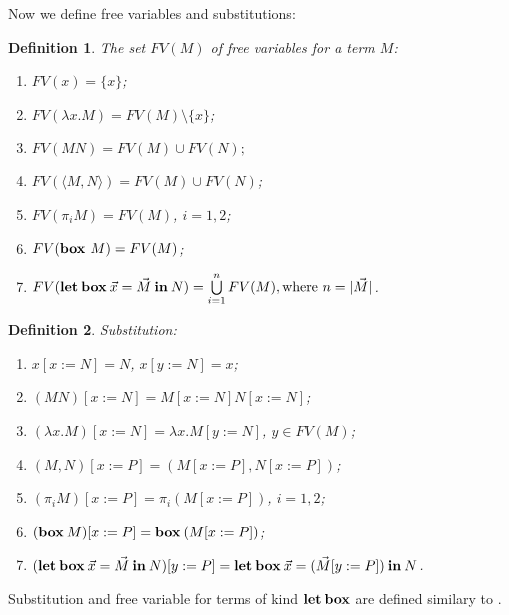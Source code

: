 \documentclass[a4paper]{article}
\newtheorem{defin}{Definition}
\begin{document}
  Now we define free variables and substitutions:

  \begin{defin} The set $FV(M)$ of free variables for a term $M$:

\begin{enumerate}
  \item $FV(x) = \{ x \}$;
  \item $FV(\lambda x. M) = FV(M) \setminus \{ x\}$;
  \item $FV(M N) = FV(M) \cup FV(N);$
  \item $FV(\langle M,N \rangle) = FV(M) \cup FV(N)$;
  \item $FV(\pi_i M) = FV(M)$, $i = 1, 2$;
  \item $FV(\text{\bf box } M) = FV(M)$;
  \item $FV({\bf let \: box} \: \vec{x} = \vec{M} {\: \bf in \:} N) = \bigcup \limits_{i = 1}^n FV(M), \text{where $n = |\vec{M}|$}$.
\end{enumerate}
  \end{defin}

  \begin{defin} Substitution:

\begin{enumerate}
  \item $x [x := N] = N$, $x [y := N] = x$;
  \item $(M N) [x := N] = M[x := N] N [x := N]$;
  \item $(\lambda x. M) [x := N] = \lambda x. M [y := N]$, $y \in FV(M)$;
  \item $(M, N)[x := P] = (M[x := P], N [x := P])$;
  \item $(\pi_i M) [x := P] = \pi_i (M[x := P])$, $i = 1, 2$;
  \item $({\bf box \: } M) [x := P] = {\bf box \: } (M [x := P])$;
  \item $({\bf let \: box \:}\vec{x} = \vec{M} {\: \bf in \:} N) [y := P] = {\bf let \: box \:} \vec{x} = (\vec{M} [y := P]) {\: \bf in \:} N$.
\end{enumerate}
  \end{defin}

Substitution and free variable for terms of kind ${\bf let \: box}$ are defined similary to \cite{ModalK}.
\end{document}
